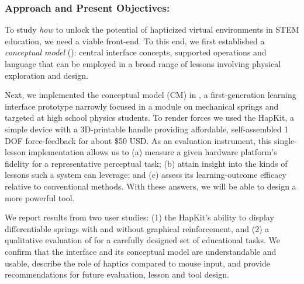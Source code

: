 \subsubsection{Approach and Present Objectives:}
To study \textit{how} to unlock the potential of hapticized virtual environments in STEM education, we need a viable front-end.
%
%
To this end, we first established a \textit{conceptual model} (\HandsOn):
central interface concepts, supported operations and language  \cite{johnson_conceptual_2002} that can be employed in a broad range of lessons involving physical exploration and design. 

Next, we implemented the \HandsOn conceptual model (CM) in \SpringSim, a first-generation learning interface prototype narrowly focused in a module on mechanical springs and targeted at high school physics students.
To render forces we used the HapKit, a simple device with a 3D-printable handle providing affordable, self-assembled 1 DOF force-feedback for about \$50 USD.
%
As an evaluation instrument, this single-lesson implementation allows us to 
(a) measure a given hardware platform's fidelity for a representative perceptual task; 
(b) attain insight into the kinds of lessons such a system can  leverage; and
(c) assess its learning-outcome efficacy relative to conventional methods.
With these answers, we will be able to design a more powerful tool.

We report results from two user studies: 
(1) the HapKit's ability to display differentiable springs with and without graphical reinforcement, and 
(2) a qualitative evaluation of \SpringSim for a carefully designed set of  educational tasks.
We confirm that the \SpringSim interface and its conceptual model \HandsOnCM %
are understandable and usable, 
describe the role of haptics compared to mouse input, and
provide %
recommendations
for future evaluation, lesson and tool design.

